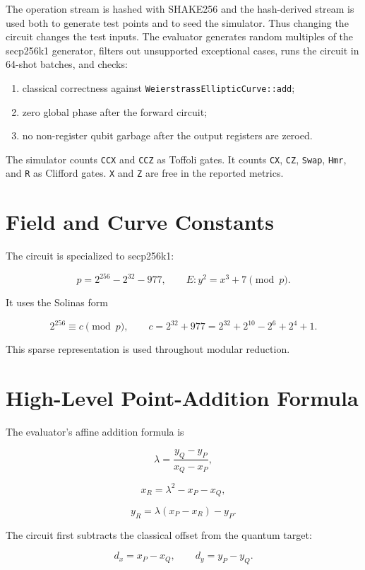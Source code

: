 \documentclass[11pt]{article}
\newcommand{\dx}{d_x}
\newcommand{\dy}{d_y}
\begin{document}
The operation stream is hashed with SHAKE256 and the hash-derived stream is used
both to generate test points and to seed the simulator.  Thus changing the
circuit changes the test inputs.  The evaluator generates random multiples of
the secp256k1 generator, filters out unsupported exceptional cases, runs the
circuit in 64-shot batches, and checks:

\begin{enumerate}[nosep]
  \item classical correctness against \texttt{WeierstrassEllipticCurve::add};
  \item zero global phase after the forward circuit;
  \item no non-register qubit garbage after the output registers are zeroed.
\end{enumerate}

The simulator counts \texttt{CCX} and \texttt{CCZ} as Toffoli gates.  It counts
\texttt{CX}, \texttt{CZ}, \texttt{Swap}, \texttt{Hmr}, and \texttt{R} as
Clifford gates.  \texttt{X} and \texttt{Z} are free in the reported metrics.

\section{Field and Curve Constants}

The circuit is specialized to secp256k1:

\[
p = 2^{256} - 2^{32} - 977,
\qquad
E: y^2=x^3+7 \pmod p.
\]

It uses the Solinas form

\[
2^{256} \equiv c \pmod p,
\qquad
c = 2^{32}+977
  = 2^{32}+2^{10}-2^6+2^4+1.
\]

This sparse representation is used throughout modular reduction.

\section{High-Level Point-Addition Formula}

The evaluator's affine addition formula is

\[
\lambda = \frac{y_Q-y_P}{x_Q-x_P},
\]

\[
x_R = \lambda^2 - x_P - x_Q,
\]

\[
y_R = \lambda(x_P-x_R)-y_P.
\]

The circuit first subtracts the classical offset from the quantum target:

\[
\dx = x_P-x_Q,
\qquad
\dy = y_P-y_Q.
\]
\end{document}
